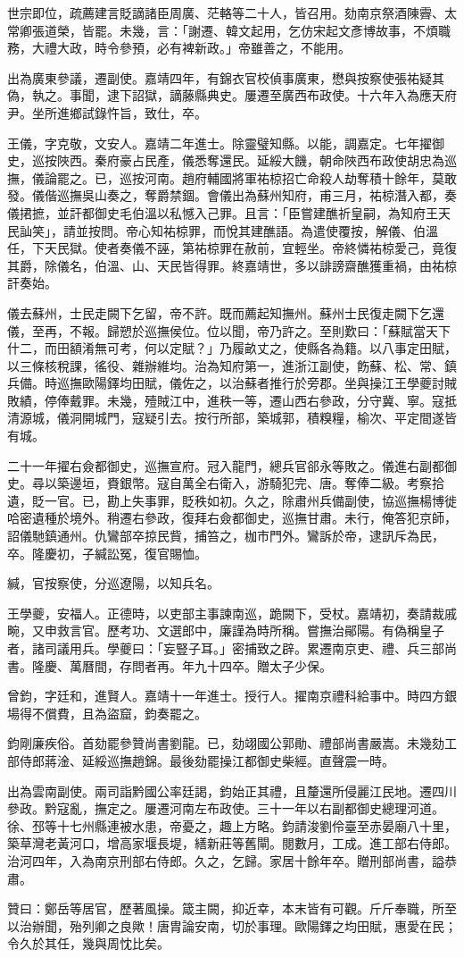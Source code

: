 \begin{pinyinscope}
世宗即位，疏薦建言貶謫諸臣周廣、茫輅等二十人，皆召用。劾南京祭酒陳霽、太常卿張道榮，皆罷。未幾，言：「謝遷、韓文起用，乞仿宋起文彥博故事，不煩職務，大禮大政，時令參預，必有裨新政。」帝雖善之，不能用。

出為廣東參議，遷副使。嘉靖四年，有錦衣官校偵事廣東，懋與按察使張祐疑其偽，執之。事聞，逮下詔獄，謫藤縣典史。屢遷至廣西布政使。十六年入為應天府尹。坐所進鄉試錄忤旨，致仕，卒。

王儀，字克敬，文安人。嘉靖二年進士。除靈璧知縣。以能，調嘉定。七年擢御史，巡按陜西。秦府豪占民產，儀悉奪還民。延綏大饑，朝命陜西布政使胡忠為巡撫，儀論罷之。已，巡按河南。趙府輔國將軍祐椋招亡命殺人劫奪積十餘年，莫敢發。儀偕巡撫吳山奏之，奪爵禁錮。會儀出為蘇州知府，甫三月，祐椋潛入都，奏儀捃摭，並訐都御史毛伯溫以私憾入己罪。且言：「臣嘗建醮祈皇嗣，為知府王天民訕笑」，請並按問。帝心知祐椋罪，而悅其建醮語。為遣使覆按，解儀、伯溫任，下天民獄。使者奏儀不誣，第祐椋罪在赦前，宜輕坐。帝終憐祐椋愛己，竟復其爵，除儀名，伯溫、山、天民皆得罪。終嘉靖世，多以誹謗齋醮獲重禍，由祐椋訐奏始。

儀去蘇州，士民走闕下乞留，帝不許。既而薦起知撫州。蘇州士民復走闕下乞還儀，至再，不報。歸愬於巡撫侯位。位以聞，帝乃許之。至則歎曰：「蘇賦當天下什二，而田額淆無可考，何以定賦？」乃履畝丈之，使縣各為籍。以八事定田賦，以三條核稅課，徭役、雜辦維均。治為知府第一，進浙江副使，飭蘇、松、常、鎮兵備。時巡撫歐陽鐸均田賦，儀佐之，以治蘇者推行於旁郡。坐與操江王學夔討賊敗績，停俸戴罪。未幾，殪賊江中，進秩一等，遷山西右參政，分守冀、寧。寇抵清源城，儀洞開城門，寇疑引去。按行所部，築城郭，積糗糧，榆次、平定間遂皆有城。

二十一年擢右僉都御史，巡撫宣府。冠入龍門，總兵官郤永等敗之。儀進右副都御史。尋以築邊垣，賚銀幣。寇自萬全右衛入，游騎犯完、唐。奪俸二級。考察拾遺，貶一官。已，勘上失事罪，貶秩如初。久之，除肅州兵備副使，協巡撫楊博徙哈密遺種於境外。稍遷右參政，復拜右僉都御史，巡撫甘肅。未行，俺答犯京師，詔儀馳鎮通州。仇鸞部卒掠民貲，捕笞之，枷市門外。鸞訴於帝，逮訊斥為民，卒。隆慶初，子緘訟冤，復官賜恤。

緘，官按察使，分巡遼陽，以知兵名。

王學夔，安福人。正德時，以吏部主事諫南巡，跪闕下，受杖。嘉靖初，奏請裁戚畹，又申救言官。歷考功、文選郎中，廉謹為時所稱。嘗撫治鄖陽。有偽稱皇子者，諸司議用兵。學夔曰：「妄豎子耳。」密捕致之辟。累遷南京吏、禮、兵三部尚書。隆慶、萬曆間，存問者再。年九十四卒。贈太子少保。

曾鈞，字廷和，進賢人。嘉靖十一年進士。授行人。擢南京禮科給事中。時四方銀場得不償費，且為盜窟，鈞奏罷之。

鈞剛廉疾俗。首劾罷參贊尚書劉龍。已，劾翊國公郭勛、禮部尚書嚴嵩。未幾劾工部侍郎蔣淦、延綏巡撫趙錦。最後劾罷操江都御史柴經。直聲震一時。

出為雲南副使。兩司詣黔國公率廷謁，鈞始正其禮，且釐還所侵麗江民地。遷四川參政。黔寇亂，撫定之。屢遷河南左布政使。三十一年以右副都御史總理河道。徐、邳等十七州縣連被水患，帝憂之，趣上方略。鈞請浚劉伶臺至赤晏廟八十里，築草灣老黃河口，增高家堰長堤，繕新莊等舊閘。閱數月，工成。進工部右侍郎。治河四年，入為南京刑部右侍郎。久之，乞歸。家居十餘年卒。贈刑部尚書，謚恭肅。

贊曰：鄭岳等居官，歷著風操。箴主闕，抑近幸，本末皆有可觀。斤斤奉職，所至以治辦聞，殆列卿之良歟！唐胄論安南，切於事理。歐陽鐸之均田賦，惠愛在民；令久於其任，幾與周忱比矣。


\end{pinyinscope}